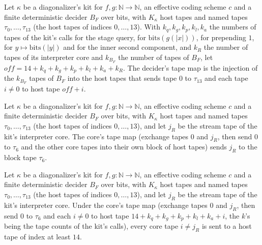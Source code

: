 \begin{definition}
\label{Turing.NTimeDiag.DzKit.bB}
\leanok
{}
Let $\kappa$ be a diagonalizer's kit for $f, g : \mathbb{N} \to \mathbb{N}$, an effective coding scheme $c$ and a finite deterministic decider $B_F$ over bits, with $K_\kappa$ host tapes and named tapes $\tau_0, \dots, \tau_{13}$ (the host tapes of indices $0, \dots, 13$). With $k_q, k_g, k_p, k_l, k_a$ the numbers of tapes of the kit's calls for the stage query, for $\mathrm{bits}(g(|x|))$, for prepending $1$, for $y \mapsto \mathrm{bits}(|y|)$ and for the inner second component, and $k_R$ the number of tapes of its interpreter core and $k_{B_F}$ the number of tapes of $B_F$, let $\mathit{off} = 14 + k_q + k_g + k_p + k_l + k_a + k_R$. The decider's tape map is the injection of the $k_{B_F}$ tapes of $B_F$ into the host tapes that sends tape $0$ to $\tau_{13}$ and each tape $i \ne 0$ to host tape $\mathit{off} + i$.
\end{definition}

\begin{theorem}
\label{Turing.NTimeDiag.DzKit.bR_j}
\leanok
{}
Let $\kappa$ be a diagonalizer's kit for $f, g : \mathbb{N} \to \mathbb{N}$, an effective coding scheme $c$ and a finite deterministic decider $B_F$ over bits, with $K_\kappa$ host tapes and named tapes $\tau_0, \dots, \tau_{13}$ (the host tapes of indices $0, \dots, 13$), and let $j_R$ be the stream tape of the kit's interpreter core. The core's tape map (exchange tapes $0$ and $j_R$, then send $0$ to $\tau_6$ and the other core tapes into their own block of host tapes) sends $j_R$ to the block tape $\tau_6$.
\end{theorem}

\begin{theorem}
\label{Turing.NTimeDiag.DzKit.bR_off}
\leanok
{}
Let $\kappa$ be a diagonalizer's kit for $f, g : \mathbb{N} \to \mathbb{N}$, an effective coding scheme $c$ and a finite deterministic decider $B_F$ over bits, with $K_\kappa$ host tapes and named tapes $\tau_0, \dots, \tau_{13}$ (the host tapes of indices $0, \dots, 13$), and let $j_R$ be the stream tape of the kit's interpreter core. Under the core's tape map (exchange tapes $0$ and $j_R$, then send $0$ to $\tau_6$ and each $i \ne 0$ to host tape $14 + k_q + k_g + k_p + k_l + k_a + i$, the $k$'s being the tape counts of the kit's calls), every core tape $i \ne j_R$ is sent to a host tape of index at least $14$.
\end{theorem}

